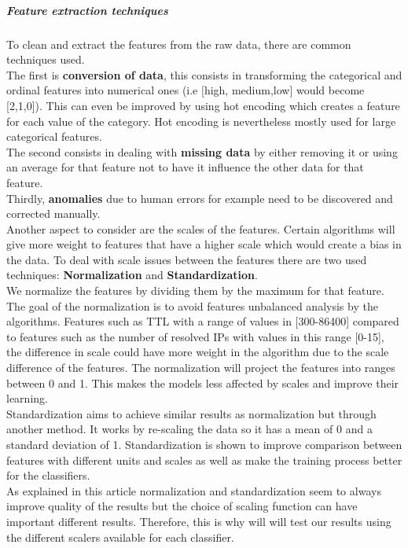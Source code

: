 \subparagraph{Feature extraction techniques} To clean and extract the features from the raw data, there are common techniques used. \\
The first is \textbf{conversion of data}, this consists in transforming the categorical and ordinal features into numerical ones (i.e [high, medium,low] would become [2,1,0]). This can even be improved by using hot encoding which creates a feature for each value of the category. Hot encoding is nevertheless mostly used for large categorical features.
\\
The second consists in dealing with \textbf{missing data} by either removing it or using an average for that feature not to have it influence the other data for that feature.\\
Thirdly, \textbf{anomalies} due to human errors for example need to be discovered and corrected manually.\\
Another aspect to consider are the scales of the features. Certain algorithms will give more weight to features that have a higher scale which would create a bias in the data. To deal with scale issues between the features there are two used techniques: \textbf{Normalization} and \textbf{Standardization}. \\
We normalize the features\cite{ml-norm} by dividing them by the maximum for that feature. The goal of the normalization is to avoid features unbalanced analysis by the algorithms. Features such as TTL with a range of values in [300-86400] compared to features such as the number of resolved IPs with values in this range [0-15], the difference in scale could have more weight in the algorithm due to the scale difference of the features. The normalization will project the features into ranges between 0 and 1. This makes the models less affected by scales and improve their learning.\\
Standardization aims to achieve similar results as normalization but through another method. It works by re-scaling the data so it has a mean of 0 and a standard deviation of 1. Standardization is shown to improve comparison between features with different units and scales as well as make the training process better for the classifiers.
\\
As explained in this article\cite{normstd} normalization and standardization seem to always improve quality of the results but the choice of scaling function can have important different results. Therefore, this is why will will test our results using the different scalers available for each classifier.

